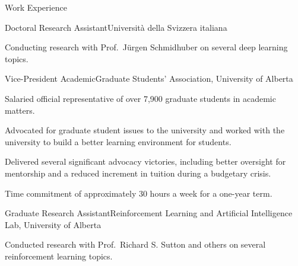 \documentclass[a4paper,dateabbrev]{cv}
\begin{document}
\begin{rSection}{Work Experience}
\vfill\clearpage

\begin{rSubsection}{Doctoral Research Assistant}{}{Universit{\`{a}} della Svizzera italiana}
    \item Conducting research with Prof.\ J{\"{u}}rgen Schmidhuber on several deep learning topics.
\end{rSubsection}

\begin{rSubsection}{Vice-President Academic}{}{Graduate Students' Association, University of Alberta}
    \item Salaried official representative of over 7,900 graduate students in academic matters.
    \item Advocated for graduate student issues to the university and worked with the university to build a better learning environment for students.
    \item Delivered several significant advocacy victories, including better oversight for mentorship and a reduced increment in tuition during a budgetary crisis.
    \item Time commitment of approximately 30 hours a week for a one-year term.
\end{rSubsection}

\begin{rSubsection}{Graduate Research Assistant}{}{Reinforcement Learning and Artificial Intelligence Lab, University of Alberta}
    \item Conducted research with Prof.\ Richard S. Sutton and others on several reinforcement learning topics.
\end{rSubsection}


\end{rSection}
\end{document}
